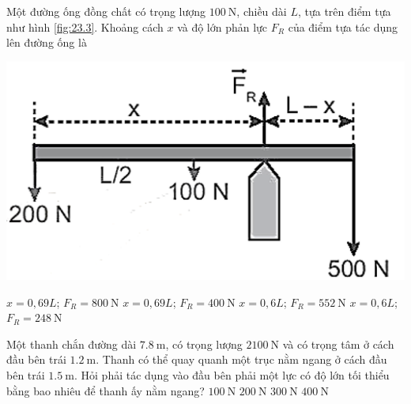 \begin{ex}
Một đường ống đồng chất có trọng lượng $\SI{100}{\newton}$, chiều dài $L$, tựa trên điểm tựa như hình \ref{fig:23.3}. Khoảng cách $x$ và độ lớn phản lực $F_R$ của điểm tựa tác dụng lên đường ống là
\begin{center}
	\includegraphics[width=0.4\linewidth]{../figs/VN10-2022-PH-TP023-P-3}
	\label{fig:23.3}
\end{center}	
	\choice
	{\True $x=0,69L$; $F_R=\SI{800}{\newton}$}
	{$x=0,69L$; $F_R=\SI{400}{\newton}$}
	{$x=0,6L$; $F_R=\SI{552}{\newton}$}
	{$x=0,6L$; $F_R=\SI{248}{\newton}$}
\end{ex}
\begin{ex}
	Một thanh chắn đường dài $\SI{7.8}{\meter}$, có trọng lượng $\SI{2100}{\newton}$ và có trọng tâm
	ở cách đầu bên trái $\SI{1.2}{\meter}$. Thanh có thể quay quanh một trục nằm ngang ở cách đầu bên trái $\SI{1.5}{\meter}$. Hỏi phải tác dụng vào đầu bên phải một lực có độ lớn tối thiểu bằng bao nhiêu để thanh ấy nằm ngang?
	\choice
	{\True $\SI{100}{\newton}$}
	{$\SI{200}{\newton}$}
	{$\SI{300}{\newton}$}
	{$\SI{400}{\newton}$}
\end{ex}

